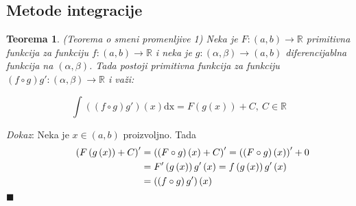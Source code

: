 \documentclass{article}
\newtheorem{teorema}{Teorema}[section]
\begin{document}
\subsection{Metode integracije}

\begin{teoremabox}
    \label{teorema_1.2}
    \begin{teorema}
        (Teorema o smeni promenljive 1) Neka je $F: \left(a, b\right) \longrightarrow \mathbb{R}$ primitivna funkcija za funkciju $f:\left(a, b\right) \longrightarrow \mathbb{R}$ i neka je $g: \left(\alpha, \beta\right) \longrightarrow \left(a, b\right)$ diferencijablna funkcija na $\left(\alpha, \beta\right)$. Tada postoji primitivna funkcija za funkciju $\left(f\circ g\right) g' : \left(\alpha, \beta\right) \longrightarrow \mathbb{R}$ i važi:\par
        \begin{equation*}
            \int \left(\left(f\circ g\right) g'\right)\left(x\right)\text{dx} = F\left(g\left(x\right)\right) + C,\ C\in\mathbb{R}
        \end{equation*}
    \end{teorema}
\end{teoremabox}
\textit{Dokaz}: Neka je $x \in \left(a, b\right)$ proizvoljno. Tada
\begin{align*}
    \hspace*{1cm}    \left(F\left(g\left(x\right)\right) + C\right)' & = \left(\left(F \circ g\right)\left(x\right) + C\right)'  = \left(\left(F \circ g\right)\left(x\right)\right)' + 0 \\
                                                                     & = F'\left(g\left(x\right)\right)  g'\left(x\right)        = f\left(g\left(x\right)\right)  g'\left(x\right)        \\
                                                                     & = \left(\left(f \circ g\right)  g'\right)\left(x\right)
\end{align*}
\null\hfill $\blacksquare$\par
\end{document}
